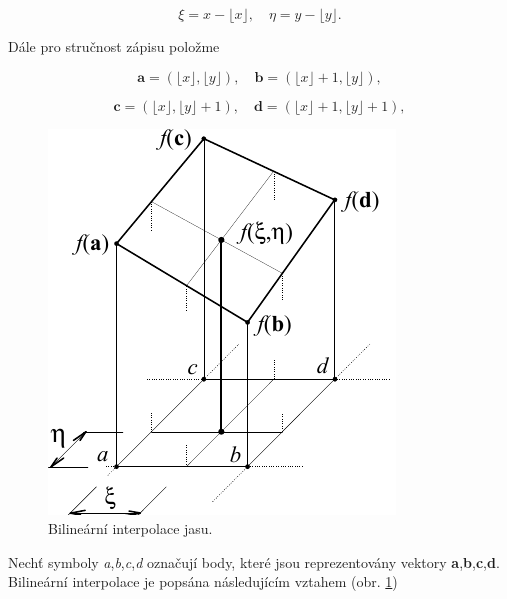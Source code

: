 \begin{equation} \label{eq:4_39}
    \xi = x - \lfloor x \rfloor, \quad \eta = y - \lfloor y \rfloor.
\end{equation}

Dále pro stručnost zápisu položme

\begin{equation} \label{eq:4_40}
    \mathbf{a} = (\lfloor x \rfloor, \lfloor y \rfloor), \quad \mathbf{b} = (\lfloor x \rfloor + 1, \lfloor y \rfloor),
\end{equation}

\begin{equation}
    \mathbf{c} = (\lfloor x \rfloor, \lfloor y \rfloor + 1), \quad \mathbf{d} = (\lfloor x \rfloor + 1, \lfloor y \rfloor + 1),\nonumber
\end{equation}

\begin{figure}[th]
    \begin{center}
        \includegraphics[scale=1.0]{04_digitalizace/images/img_4_7.pdf}
    \end{center}
    \caption{Bilineární interpolace jasu.}
    \label{img:4_7}
\end{figure}

Nechť symboly \textit{a},\textit{b},\textit{c},\textit{d} označují body, které jsou reprezentovány vektory \textbf{a},\textbf{b},\textbf{c},\textbf{d}. Bilineární interpolace je popsána následujícím vztahem (obr. \ref{img:4_7})

